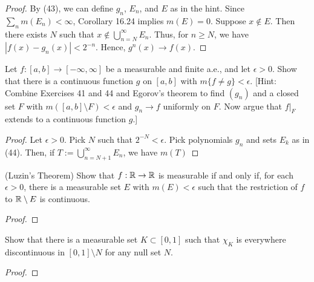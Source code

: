 \documentclass{article}
\begin{document}
\begin{proof}
By (43), we can define $g_n$, $E_n$, and $E$ as in the hint. Since $\sum_n m(E_n) < \infty$, Corollary 16.24 implies $m(E) = 0$.  Suppose $x \not\in E$. Then there exists $N$ such that $x \not\in \bigcup_{n=N}^\infty E_n$. Thus, for $n \ge N$, we have $|f(x) - g_n(x)| < 2^{-n}$. Hence, $g^n(x) \to f(x)$.
\end{proof}
 Let $f: [a,b] \to [-\infty,\infty]$ be a measurable and finite a.e., and let $\epsilon >0$. Show that there is a continuous function $g$ on $[a,b]$ with $m\{f \ne g\} < \epsilon$. [Hint: Combine Exercises 41 and 44 and Egorov's theorem to find $(g_n)$ and a closed set $F$ with $m([a,b]\setminus F) < \epsilon$ and $g_n \to f$ uniformly on $F$. Now argue that $f|_F$ extends to a continuous function $g$.]
\begin{proof}
Let $\epsilon >0$.  Pick $N$ such that $2^{-N} <\epsilon$.  Pick polynomials $g_n$ and sets $E_k$ as in (44). Then, if $T := \bigcup_{n=N+1}^\infty E_n$, we have $m(T)$
\end{proof}
 (Luzin's Theorem) Show that $f: \mathbb{R}\to\mathbb{R}$ is measurable if and only if, for each $\epsilon >0$, there is a measurable set $E$ with $m(E) < \epsilon$ such that the restriction of $f$ to $\mathbb{R}\setminus E$ is continuous.
\begin{proof}
\end{proof}
 Show that there is a measurable set $K \subset [0,1]$ such that $\chi_K$ is everywhere discontinuous in $[0,1] \setminus N$ for any null set $N$.
\begin{proof}
\end{proof}
\end{document}
